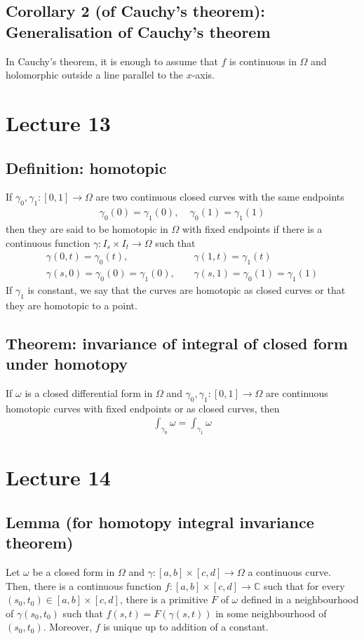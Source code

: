 \documentclass[11pt]{article}
\newcommand{\C}{\mathbb{C}}
\begin{document}
\subsection{Corollary 2 (of Cauchy's theorem): Generalisation of Cauchy's theorem}
In Cauchy's theorem, it is enough to assume that $f$ is continuous in $\Omega$ and holomorphic outside a line parallel to the $x$-axis. 

\section{Lecture 13}
\subsection{Definition: homotopic}
If $\gamma_0, \gamma_1 : [0,1] \to \Omega$ are two continuous closed curves with the same endpoints
\begin{align*}
    \gamma_0(0) = \gamma_1(0), ~~~~~ \gamma_0(1) = \gamma_1(1)
\end{align*}
then they are said to be homotopic in $\Omega$ with fixed endpoints if there is a continuous function $\gamma: I_s \times I_t \to \Omega$ such that
\begin{align*}
    \gamma(0, t) = \gamma_0(t), ~~&~~~ \gamma(1,t) = \gamma_1(t) \\
    \gamma(s, 0) = \gamma_0(0) = \gamma_1(0), ~~&~~~ \gamma(s, 1) = \gamma_0(1) = \gamma_1(1)
\end{align*}
If $\gamma_1$ is constant, we say that the curves are homotopic as closed curves or that they are homotopic to a point. 

\subsection{Theorem: invariance of integral of closed form under homotopy}
If $\omega$ is a closed differential form in $\Omega$ and $\gamma_0, \gamma_1:[0,1] \to \Omega$ are continuous homotopic curves with fixed endpoints or as closed curves, then 
\begin{align*}
    \int_{\gamma_0} \omega = \int_{\gamma_1}\omega 
\end{align*}

\section{Lecture 14}

\subsection{Lemma (for homotopy integral invariance theorem)}
Let $\omega$ be a closed form in $\Omega$ and $\gamma: [a,b] \times [c,d] \to \Omega$ a continuous curve. Then, there is a continuous function $f: [a,b] \times [c,d] \to \C$ such that for every $(s_0, t_0) \in [a,b] \times [c,d]$, there is a primitive $F$ of $\omega$ defined in a neighbourhood of $\gamma(s_0, t_0)$ such that $f(s,t) = F(\gamma(s,t))$ in some neighbourhood of $(s_0, t_0)$. Moreover, $f$ is unique up to addition of a constant. 
\end{document}

